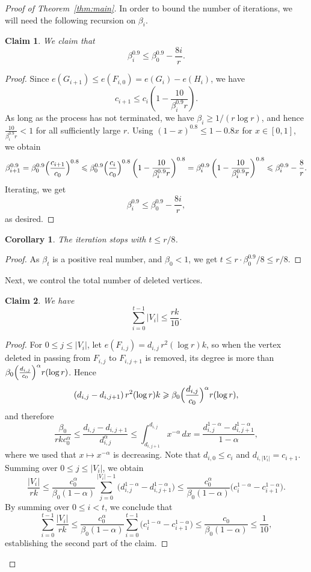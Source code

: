 \documentclass[10pt,a4paper]{amsart}
\newtheorem{claim}{Claim}
\newtheorem{corollary}{Corollary}
\renewcommand{\ge}{\geqslant}
\renewcommand{\geq}{\ge}
\renewcommand{\le}{\leqslant}
\renewcommand{\leq}{\le}
\begin{document}
\begin{proof}[Proof of Theorem~\ref{thm:main}]
In order to bound the number of iterations, we will need the following recursion on $\beta_i$.

\begin{claim}\label{claim:ci}
    We claim that 
    \[\beta_i^{0.9}\leq \beta_0^{0.9}-\frac{8 i}{r}.\]
\end{claim}

\begin{proof}
    Since $e(G_{i+1})\leq e(F_{i,0})=e(G_i)-e(H_i)$, we have
\[c_{i+1}\leq c_i\left(1-\frac{10}{\beta_i^{0.9}r}\right).\]
As long as the process has not terminated, we have $\beta_i\geq 1/(r\log r)$, and hence $\frac{10}{\beta_i^{0.9}r} <1$ for all sufficiently large $r$. Using $(1-x)^{0.8}\leq 1-0.8x$ for $x\in[0,1]$, we obtain
\[\beta_{i+1}^{0.9}=
\beta_0^{0.9}\Bigl(\frac{c_{i+1}}{c_0}\Bigr)^{0.8} \leq
\beta_0^{0.9}\Bigl(\frac{c_i}{c_0}\Bigr)^{0.8}
\left(1-\frac{10}{\beta_i^{0.9}r}\right)^{0.8} =
\beta_i^{0.9}\left(1-\frac{10}{\beta_i^{0.9}r}\right)^{0.8}\leq
\beta_i^{0.9}-\frac{8}{r}.\]
Iterating, we get
\[\beta_i^{0.9}\leq \beta_0^{0.9}-\frac{8 i}{r},\]
as desired.
\end{proof}

\begin{corollary}
    The iteration stops with $t \leq r/8$.
\end{corollary}
\begin{proof}
    As $\beta_t$ is a positive real number, and $\beta_0<1$, we get $t\leq r\cdot\beta_0^{0.9}/8\leq r/8$.
\end{proof}

Next, we control the total number of deleted vertices.

\begin{claim}
   We have
    \[\sum_{i=0}^{t-1}|V_i|\leq \frac{rk}{10}.\]
\end{claim}

\begin{proof} 
 For $0\leq j\leq |V_i|$, let $e(F_{i,j})=d_{i,j}\,r^2(\log r)k$, so when the vertex deleted in passing from $F_{i,j}$ to $F_{i,j+1}$ is removed, its degree is more than $\beta_0\Bigl(\frac{d_{i,j}}{c_0}\Bigr)^\alpha r(\log r)$. Hence
\[(d_{i,j}-d_{i,j+1})\,r^2(\log r)k
\geq \beta_0\Bigl(\frac{d_{i,j}}{c_0}\Bigr)^\alpha r(\log r),\]
and therefore
\[\frac{\beta_0}{rkc_0^{\alpha}}
\leq \frac{d_{i,j}-d_{i,j+1}}{d_{i,j}^\alpha}\leq \int_{d_{i,j+1}}^{d_{i,j}}x^{-\alpha}\,dx
=\frac{d_{i,j}^{1-\alpha}-d_{i,j+1}^{1-\alpha}}{1-\alpha},\]
where we used that $x\mapsto x^{-\alpha}$ is decreasing. Note that $d_{i,0}
\leq c_i$ and $d_{i,|V_i|}=c_{i+1}$.
Summing over $0\leq j\leq |V_i|$, we obtain
\[\frac{|V_i|}{rk}
\leq \frac{c_0^\alpha}{\beta_0(1-\alpha)}
\sum_{j=0}^{|V_i|-1}\bigl(d_{i,j}^{1-\alpha}-d_{i,j+1}^{1-\alpha}\bigr)
\leq \frac{c_0^\alpha}{\beta_0(1-\alpha)}
\bigl(c_i^{1-\alpha}-c_{i+1}^{1-\alpha}\bigr).\]
By summing over $0\leq i<t$, we conclude that
\[\sum_{i=0}^{t-1}\frac{|V_i|}{rk}
\leq
\frac{c_0^\alpha}{\beta_0(1-\alpha)}
\sum_{i=0}^{t-1}\bigl(c_i^{1-\alpha}-c_{i+1}^{1-\alpha}\bigr)
\leq
\frac{c_0}{\beta_0(1-\alpha)}
\leq \frac1{10},\]
establishing the second part of the claim.    
\end{proof}


\end{proof}
\end{document}
